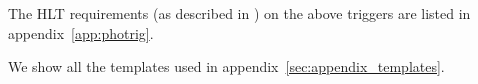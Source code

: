 The HLT requirements (as described in \cite{ref:eghlt}) on the above triggers are listed in appendix~\ref{app:photrig}.




We show all the templates used in appendix~\ref{sec:appendix_templates}.
